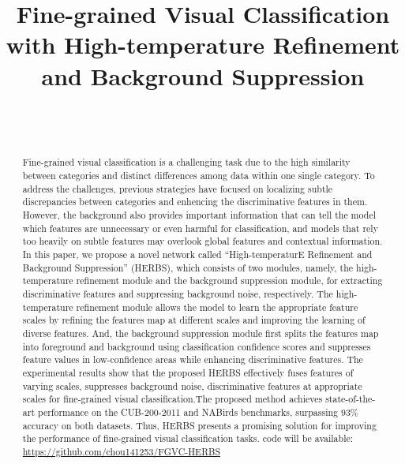 \documentclass[journal]{IEEEtran}
\begin{document}
\title{\selectfont \fontsize{18}{20}\selectfont Fine-grained Visual Classification with High-temperature Refinement and Background Suppression}


\author{
\\
\\
}



\maketitle
\begin{abstract}
Fine-grained visual classification is a challenging task due to the high similarity between categories and distinct differences among data within one single category. To address the challenges, previous strategies have focused on localizing subtle discrepancies between categories and enhencing the discriminative features in them. However, the background also provides important information that can tell the model which features are unnecessary or even harmful for classification, and models that rely too heavily on subtle features may overlook global features and contextual information. In this paper, we propose a novel network called ``High-temperaturE Refinement and Background Suppression'' (HERBS), which consists of two modules, namely, the high-temperature refinement module and the background suppression module, for extracting discriminative features and suppressing background noise, respectively. The high-temperature refinement module allows the model to learn the appropriate feature scales by refining the features map at different scales and improving the learning of diverse features. And, the background suppression module first splits the features map into foreground and background using classification confidence scores and suppresses feature values in low-confidence areas while enhancing discriminative features. The experimental results show that the proposed HERBS effectively fuses features of varying scales, suppresses background noise, discriminative features at appropriate scales for fine-grained visual classification.The proposed method achieves state-of-the-art performance on the CUB-200-2011 and NABirds benchmarks, surpassing 93\% accuracy on both datasets. Thus, HERBS presents a promising solution for improving the performance of fine-grained visual classification tasks. code will be available: \url{https://github.com/chou141253/FGVC-HERBS}
\end{abstract}
\end{document}
